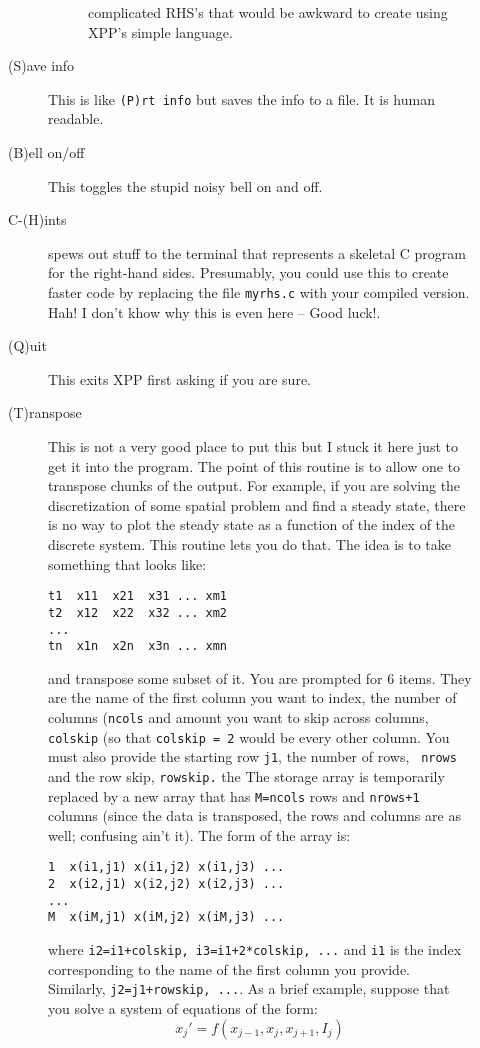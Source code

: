 \documentclass{article}
\begin{document}
\begin{description}
\begin{description}
\begin{description}
complicated RHS's that would be awkward to create using XPP's simple
language.
\end{description}
\item[(S)ave info] This is like {\tt (P)rt info} but saves the info to
a file.  It is human readable.
\item[(B)ell on/off]  This toggles the stupid noisy bell on and off.
\item[C-(H)ints] spews out stuff to the terminal that represents a
skeletal C program for the right-hand sides.  Presumably, you could
use this to create faster code by replacing the file {\tt myrhs.c}
with your compiled version. Hah! I don't khow why this is even here --
Good luck!.
\item[(Q)uit]  This exits XPP first asking if you are sure.
\item[ (T)ranspose ]  This is not a very good place to put this but I
stuck it here just to get it into the program.  The point of this
routine is to allow one to transpose chunks of the output.  For
example, if you are solving the discretization of some spatial problem
and find a steady state, there is no way to plot the steady state as a
function of the index of the discrete system.  This routine lets you
do that.  The idea is to take something that looks like:
\begin{verbatim}
t1  x11  x21  x31 ... xm1
t2  x12  x22  x32 ... xm2
...
tn  x1n  x2n  x3n ... xmn
\end{verbatim}
and transpose some subset of it. You are prompted for 6 items.  They
are the name of the first column you want to index, the number of
columns ({\tt ncols} and amount you want to skip across columns, {\tt
colskip} (so that {\tt colskip = 2} would be every other column.  You
must also provide the starting row {\tt j1}, the number of rows, {\tt
nrows} and the row skip, {\tt rowskip.} the The storage array is temporarily
replaced by a new array that has {\tt M=ncols} rows and {\tt nrows+1}
columns (since the data is transposed, the rows and columns are as
well; confusing ain't it).  The form of the array is:
\begin{verbatim}
1  x(i1,j1) x(i1,j2) x(i1,j3) ...
2  x(i2,j1) x(i2,j2) x(i2,j3) ...
...
M  x(iM,j1) x(iM,j2) x(iM,j3) ...
\end{verbatim}
where {\tt i2=i1+colskip, i3=i1+2*colskip, ...} and {\tt i1} is the
index corresponding to the name of the first column you
provide. Similarly, {\tt j2=j1+rowskip, ...}. As a brief example,
suppose that you solve a system of equations of the form:
\[
 x_j' = f(x_{j-1},x_j,x_{j+1},I_j)
\]
\end{description}
\end{description}
\end{document}
